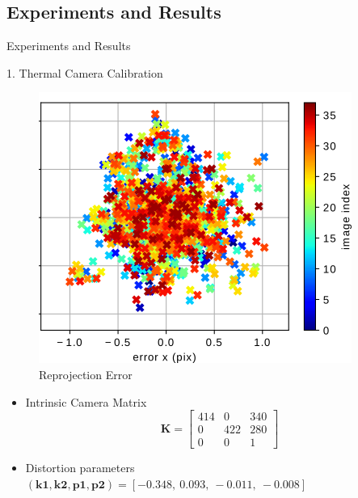 \documentclass[10pt]{beamer}
\begin{document}
\subsection*{Experiments and Results}
\begin{frame}{Experiments and Results}
    \begin{description}
        \item[1. Thermal Camera Calibration]
    \end{description}{}

    \begin{figure}[h!]
        \centering
        \includegraphics[scale=0.30]{Thermal_calibration.png}
        \caption{Reprojection Error}
        \label{fig: rej-error}
    \end{figure}
    \pause
    \vspace{-0.5cm}
        \begin{itemize}
            \item Intrinsic Camera Matrix \\ 
            \begin{equation*}
                \mathbf{K} = \begin{bmatrix}
                    414 & 0   & 340 \\
                    0   & 422 & 280 \\
                    0   & 0   & 1
                \end{bmatrix}
            \end{equation*}
            \pause
            
            \item Distortion parameters $\mathbf{(k1,k2,p1,p2)}=[-0.348,~  0.093,~ -0.011,~ -0.008]$
        \end{itemize}

\end{frame}
\end{document}

